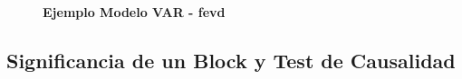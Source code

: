 \begin{figure}[H]
	\centering
	\textbf{Ejemplo Modelo VAR - fevd}\par\medskip
	\caption{}\label{figd48}
\end{figure}
\subsection{Significancia de un Block y Test de Causalidad}
	
